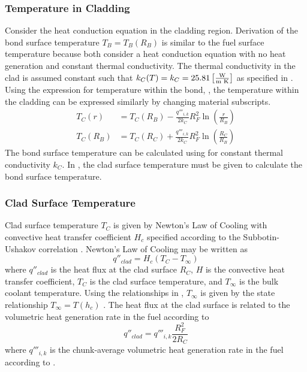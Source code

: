     \subsubsection{Temperature in Cladding}
      Consider the heat conduction equation in the cladding region. Derivation
      of the bond surface temperature $T_B=T_B(R_B)$ is similar to
      the fuel surface temperature because both consider a heat conduction
      equation with no heat generation and constant thermal conductivity.
      The
      thermal conductivity in the clad is assumed constant such that $k_C(T) =
      k_C = 25.81 \left[\text{{$\frac{\text{W}}{\text{m K}}$}}\right]$ as specified in
      .
      Using the expression for temperature within the bond,
      , the temperature within the cladding can be expressed
      similarly by changing material subscripts. 
      \begin{align}
        \label{eq:tcr}
        T_C(r) &= T_C(R_B) - \frac{q'''_{i,k}}{2 k_C} R_F^2
          \ln\left(\frac{r}{R_B}\right) \\
        \label{eq:tb_forward}
        T_C(R_B) &= T_C(R_C) + \frac{q'''_{i,k}}{2 k_C} R_F^2
          \ln\left(\frac{R_C}{R_B}\right)
      \end{align}
      The bond surface temperature can be calculated using 
      for constant thermal conductivity $k_C$. In , the clad
      surface temperature must be given to calculate the bond surface
      temperature.

    \subsubsection{Clad Surface Temperature}
      Clad surface temperature $T_C$ is given by Newton's Law of Cooling with
      convective heat transfer coefficient $H_c$ specified according to the
      Subbotin-Ushakov correlation \cite{subbotinUshakov}. Newton's Law of 
      Cooling may be written as
      \begin{equation}
        q''_{clad} = H_c (T_C - T_{\infty})
      \end{equation}
      where $q''_{clad}$ is the heat flux at the clad surface $R_C$, $H$ is
      the convective heat transfer coefficient, $T_C$ is the clad surface
      temperature, and $T_{\infty}$ is the bulk coolant temperature. Using the
      relationships in , $T_{\infty}$ is given
      by the state relationship $T_{\infty} = T(h_c)$ \cite{sodiumProp}.
      The heat flux at the clad surface is related to the volumetric heat 
      generation rate in the fuel according to 
      \begin{equation}
        q''_{clad} = q'''_{i,k} \frac{R_F^2}{2 R_C}
      \end{equation}
      where $q'''_{i,k}$ is the chunk-average volumetric heat generation rate 
      in the fuel according to .


